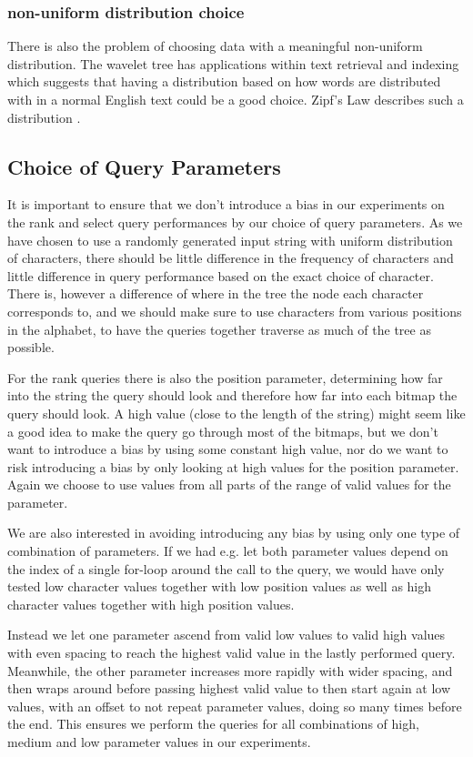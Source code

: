 \subsubsection{non-uniform distribution choice}
There is also the problem of choosing data with a meaningful non-uniform distribution.
The wavelet tree has applications within text retrieval and indexing which suggests that having a distribution based on how words are distributed with in a normal English text could be a good choice. 
Zipf's Law describes such a distribution \citep[abstract]{ZipfsLawOnText}.

\subsection{Choice of Query Parameters}
It is important to ensure that we don't introduce a bias in our experiments on the rank and select query performances by our choice of query parameters.
As we have chosen to use a randomly generated input string with uniform distribution of characters, there should be little difference in the frequency of characters and little difference in query performance based on the exact choice of character.
There is, however a difference of where in the tree the node each character corresponds to, and we should make sure to use characters from various positions in the alphabet, to have the queries together traverse as much of the tree as possible.

For the rank queries there is also the position parameter, determining how far into the string the query should look and therefore how far into each bitmap the query should look.
A high value (close to the length of the string) might seem like a good idea to make the query go through most of the bitmaps, but we don't want to introduce a bias by using some constant high value, nor do we want to risk introducing a bias by only looking at high values for the position parameter.
Again we choose to use values from all parts of the range of valid values for the parameter.

We are also interested in avoiding introducing any bias by using only one type of combination of parameters.
If we had e.g. let both parameter values depend on the index of a single for-loop around the call to the query, we would have only tested low character values together with low position values as well as high character values together with high position values.

Instead we let one parameter ascend from valid low values to valid high values with even spacing to reach the highest valid value in the lastly performed query. Meanwhile, the other parameter increases more rapidly with wider spacing, and then wraps around before passing highest valid value to then start again at low values, with an offset to not repeat parameter values, doing so many times before the end.
This ensures we perform the queries for all combinations of high, medium and low parameter values in our experiments.

